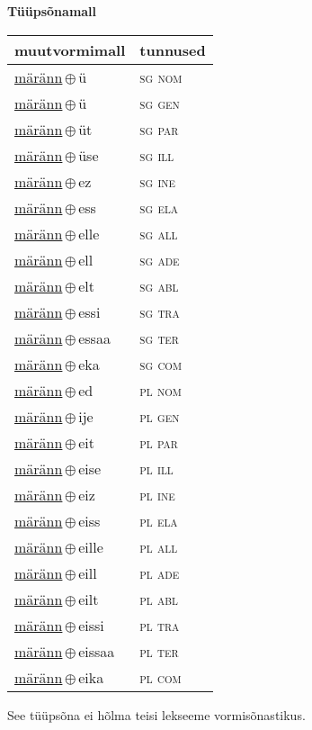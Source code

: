 

\vspace{3.5em}
\noindent \begin{minipage}{\textwidth}
\noindent \textbf{Tüüpsõnamall \,}\\

\begin{sideways}
\begin{tabular}{l l}
muutvormimall & tunnused \\
\hline
\underline{märänn}\,$\oplus$\,ü & \textsc{ sg nom } \\
\underline{märänn}\,$\oplus$\,ü & \textsc{ sg gen } \\
\underline{märänn}\,$\oplus$\,üt & \textsc{ sg par } \\
\underline{märänn}\,$\oplus$\,üse & \textsc{ sg ill } \\
\underline{märänn}\,$\oplus$\,ez & \textsc{ sg ine } \\
\underline{märänn}\,$\oplus$\,ess & \textsc{ sg ela } \\
\underline{märänn}\,$\oplus$\,elle & \textsc{ sg all } \\
\underline{märänn}\,$\oplus$\,ell & \textsc{ sg ade } \\
\underline{märänn}\,$\oplus$\,elt & \textsc{ sg abl } \\
\underline{märänn}\,$\oplus$\,essi & \textsc{ sg tra } \\
\underline{märänn}\,$\oplus$\,essaa & \textsc{ sg ter } \\
\underline{märänn}\,$\oplus$\,eka & \textsc{ sg com } \\
\underline{märänn}\,$\oplus$\,ed & \textsc{ pl nom } \\
\underline{märänn}\,$\oplus$\,ije & \textsc{ pl gen } \\
\underline{märänn}\,$\oplus$\,eit & \textsc{ pl par } \\
\underline{märänn}\,$\oplus$\,eise & \textsc{ pl ill } \\
\underline{märänn}\,$\oplus$\,eiz & \textsc{ pl ine } \\
\underline{märänn}\,$\oplus$\,eiss & \textsc{ pl ela } \\
\underline{märänn}\,$\oplus$\,eille & \textsc{ pl all } \\
\underline{märänn}\,$\oplus$\,eill & \textsc{ pl ade } \\
\underline{märänn}\,$\oplus$\,eilt & \textsc{ pl abl } \\
\underline{märänn}\,$\oplus$\,eissi & \textsc{ pl tra } \\
\underline{märänn}\,$\oplus$\,eissaa & \textsc{ pl ter } \\
\underline{märänn}\,$\oplus$\,eika & \textsc{ pl com } \\
\end{tabular}
\end{sideways}
\label{tab:tüüpsõnamall-märännü}

\end{minipage}

 
\vspace{1em}
\noindent See tüüpsõna ei hõlma teisi lekseeme vormi\-sõnastikus.

